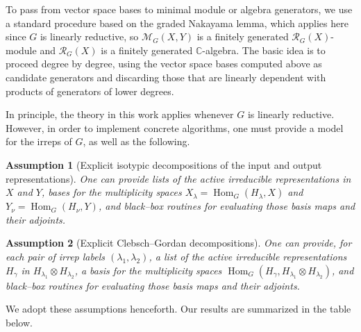 \documentclass[11pt]{article}
\newcommand{\dsC}{\mathbb{C}}
\newcommand{\scM}{\mathcal{M}}
\newcommand{\scR}{\mathcal{R}}
\newcommand{\HomG}[2]{\operatorname{Hom}_G\!\left(#1,#2\right)}
\newtheorem{assumption}{Assumption}[section]
\theoremstyle{definition}
\begin{document}
To pass from vector space bases to minimal module or algebra generators, we use a standard procedure based on the graded Nakayama lemma, which applies here since $G$ is linearly reductive, so $\scM_G(X,Y)$ is a finitely generated $\scR_G(X)$-module and $\scR_G(X)$ is a finitely generated $\dsC$-algebra. The basic idea is to proceed degree by degree, using the vector space bases computed above as candidate generators and discarding those that are linearly dependent with products of generators of lower degrees.

In principle, the theory in this work applies whenever $G$ is linearly reductive.
However, in order to implement concrete algorithms, one must provide a model for the irreps of $G$, as well as the following.

\begin{assumption}[Explicit isotypic decompositions of the input and output representations]\label{ass:explicit-isotypic}
  One can provide lists of the active irreducible representations in $X$ and $Y$, bases for the multiplicity spaces $X_\lambda = \HomG{H_\lambda}{X}$ and $Y_\nu = \HomG{H_\nu}{Y}$, and black--box routines for evaluating those basis maps and their adjoints.
\end{assumption}

\begin{assumption}[Explicit Clebsch--Gordan decompositions]\label{ass:explicit-cg}
  One can provide, for each pair of irrep labels $(\lambda_1,\lambda_2)$, a list of the active irreducible representations $H_\gamma$ in $H_{\lambda_1} \otimes H_{\lambda_2}$, a basis for the multiplicity spaces $\HomG{H_\gamma}{H_{\lambda_1} \otimes H_{\lambda_2}}$, and black--box routines for evaluating those basis maps and their adjoints.
\end{assumption}

We adopt these assumptions henceforth.
Our results are summarized in the table below.
\end{document}
